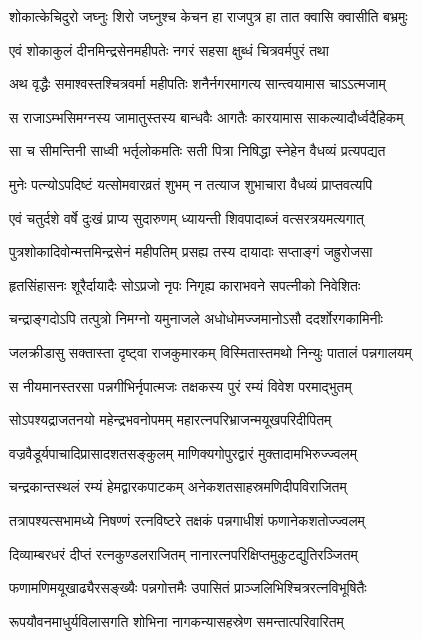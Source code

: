 \begin{center}
\twolineshloka
{शोकात्केचिदुरो जघ्नुः शिरो जघ्नुश्च केचन}
{हा राजपुत्र हा तात क्वासि क्वासीति बभ्रमुः} %

\twolineshloka
{एवं शोकाकुलं दीनमिन्द्रसेनमहीपतेः}
{नगरं सहसा क्षुब्धं चित्रवर्मपुरं तथा} %

\twolineshloka
{अथ वृद्धैः समाश्वस्तश्चित्रवर्मा महीपतिः}
{शनैर्नगरमागत्य सान्त्वयामास चाऽऽत्मजाम्} %

\twolineshloka
{स राजाऽम्भसिमग्नस्य जामातुस्तस्य बान्धवैः}
{आगतैः कारयामास साकल्यादौर्ध्वदैहिकम्} %

\twolineshloka
{सा च सीमन्तिनी साध्वी भर्तृलोकमतिः सती}
{पित्रा निषिद्धा स्नेहेन वैधव्यं प्रत्यपद्यत} %

\twolineshloka
{मुनेः पत्न्योऽपदिष्टं यत्सोमवारव्रतं शुभम्}
{न तत्याज शुभाचारा वैधव्यं प्राप्तवत्यपि} %

\twolineshloka
{एवं चतुर्दशे वर्षे दुःखं प्राप्य सुदारुणम्}
{ध्यायन्ती शिवपादाब्जं वत्सरत्रयमत्यगात्} %

\twolineshloka
{पुत्रशोकादिवोन्मत्तमिन्द्रसेनं महीपतिम्}
{प्रसह्य तस्य दायादाः सप्ताङ्गं जह्रुरोजसा} %

\twolineshloka
{हृतसिंहासनः शूरैर्दायादैः सोऽप्रजो नृपः}
{निगृह्य काराभवने सपत्नीको निवेशितः} %

\twolineshloka
{चन्द्राङ्गदोऽपि तत्पुत्रो निमग्नो यमुनाजले}
{अधोधोमज्जमानोऽसौ ददर्शोरगकामिनीः} %

\twolineshloka
{जलक्रीडासु सक्तास्ता दृष्ट्वा राजकुमारकम्}
{विस्मितास्तमथो निन्युः पातालं पन्नगालयम्} %

\twolineshloka
{स नीयमानस्तरसा पन्नगीभिर्नृपात्मजः}
{तक्षकस्य पुरं रम्यं विवेश परमाद्भुतम्} %

\twolineshloka
{सोऽपश्यद्राजतनयो महेन्द्रभवनोपमम्}
{महारत्नपरिभ्राजन्मयूखपरिदीपितम्} %

\twolineshloka
{वज्रवैडूर्यपाचादिप्रासादशतसङ्कुलम्}
{माणिक्यगोपुरद्वारं मुक्तादामभिरुज्ज्वलम्} %

\twolineshloka
{चन्द्रकान्तस्थलं रम्यं हेमद्वारकपाटकम्}
{अनेकशतसाहस्रमणिदीपविराजितम्} %

\twolineshloka
{तत्रापश्यत्सभामध्ये निषण्णं रत्नविष्टरे}
{तक्षकं पन्नगाधीशं फणानेकशतोज्ज्वलम्} %

\twolineshloka
{दिव्याम्बरधरं दीप्तं रत्नकुण्डलराजितम्}
{नानारत्नपरिक्षिप्तमुकुटद्युतिरञ्जितम्} %

\twolineshloka
{फणामणिमयूखाढ्यैरसङ्ख्यैः पन्नगोत्तमैः}
{उपासितं प्राञ्जलिभिश्चित्ररत्नविभूषितैः} %

\twolineshloka
{रूपयौवनमाधुर्यविलासगति शोभिना}
{नागकन्यासहस्रेण समन्तात्परिवारितम्} %


\end{center}
